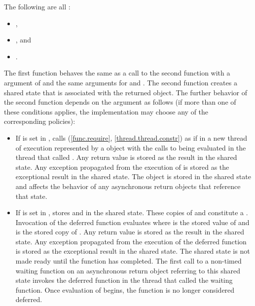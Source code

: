 \begin{itemdescr}
\pnum
\mandates
The following are all :
\begin{itemize}
\item {},
\item {}, and
\item {}.
\end{itemize}

\pnum
\effects
The first function
behaves the same as a call to the second function with a  argument of
and the same arguments for  and .
The second function creates a shared state that is associated with
the returned  object.
The further behavior
of the second function depends on the  argument as follows (if
more than one of these conditions applies, the implementation may choose any of
the corresponding policies):
\begin{itemize}
\item
If  is set in , calls
(\ref{func.require}, \ref{thread.thread.constr})
as if in a new thread of execution represented by a  object
with the calls to  being evaluated in the thread that called .
Any return value
is stored as the result in the
shared state. Any exception propagated from
the execution of
is stored as the exceptional result in the shared state.
The  object is
stored in the shared state
and affects the behavior of any asynchronous return objects that
reference that state.

\item
If  is set in ,
stores  and
in the shared state. These copies of  and  constitute
a . Invocation of the deferred function evaluates
 where  is the stored value of
 and  is the stored copy of
.
Any return value is stored
as the result in the shared state.
Any exception propagated
from the execution
of the deferred function
is stored as the exceptional result
in the shared state.
The shared state is not
made ready until the function has completed. The first call to a
non-timed waiting function
on an asynchronous return object referring to
this shared state invokes the
deferred function in the thread that called the waiting function.
Once evaluation of  begins, the function is no longer
considered deferred.


\end{itemize}
\end{itemdescr}
